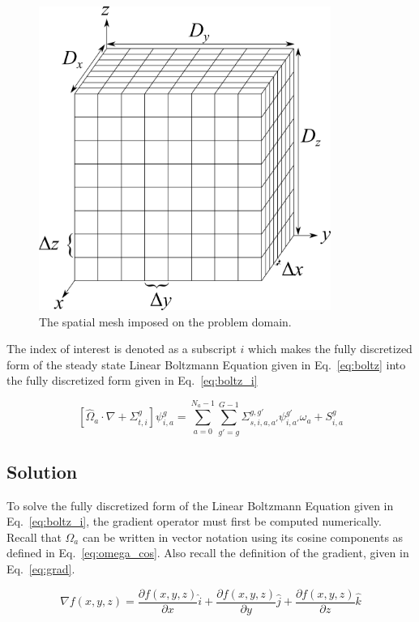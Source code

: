 \begin{figure}[tb]
  \begin{center}
   \includegraphics[width=3.75in]{figs/spatial_disc}
  \end{center}
  \caption{The spatial mesh imposed on the problem domain.}
\label{fig:spatial_disc}
\end{figure}%

The index of interest is denoted as a subscript $i$ which makes the fully discretized form of the steady state Linear Boltzmann Equation given in Eq.~\ref{eq:boltz} into the fully discretized form given in Eq.~\ref{eq:boltz_i}

\begin{equation} \label{eq:boltz_i}
\left[ \hat{\Omega}_a \cdot \nabla + \Sigma_{t,i}^g \right]
\psi_{i,a}^{g} = 
\sum_{a=0}^{N_a-1} \sum_{g'=g}^{G-1} \Sigma_{s, i, a, a'}^{g, g'} \psi_{i, a'}^{g'} \omega_a + S_{i,a}^g
\end{equation}

\subsection{Solution}

To solve the fully discretized form of the Linear Boltzmann Equation given in Eq.~\ref{eq:boltz_i}, the gradient operator must first be computed numerically. Recall that $\Omega_a$ can be written in vector notation using its cosine components as defined in Eq.~\ref{eq:omega_cos}. Also recall the definition of the gradient, given in Eq.~\ref{eq:grad}.

\begin{equation} \label{eq:grad}
\nabla f(x, y, z) = \frac{\partial f(x, y, z)}{\partial x} \hat{i} + \frac{\partial f(x, y, z)}{\partial y} \hat{j} + \frac{\partial f(x, y, z)}{\partial z} \hat{k}
\end{equation}


